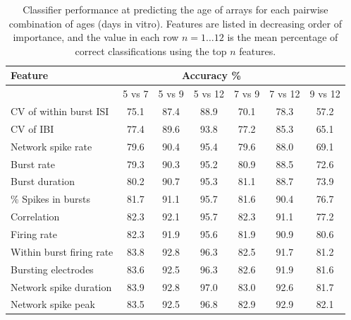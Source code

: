 \documentclass{article}
\begin{document}
\begin{table}
  \centering
  \begin{tabular}{|l|c|c|c|c|c|c|}
	  \hline
	  \textbf{Feature} & \multicolumn{5}{c}{\textbf{Accuracy \%}} & 
	  \\ \hline
	  & 5 vs 7 & 5 vs 9 & 5 vs 12 & 7 vs 9 & 7 vs 12 & 9 vs 12
	  \\ \hline 
		CV of within burst ISI & 75.1 & 87.4 & 88.9 & 70.1 & 78.3 & 57.2
		\\ CV of IBI & 77.4 & 89.6 & 93.8 & 77.2 & 85.3 & 65.1
		\\ Network spike rate& 79.6 & 90.4 & 95.4  & 79.6 & 88.0 & 69.1
		\\ Burst rate & 79.3 & 90.3 & 95.2 & 80.9 & 88.5 & 72.6
		\\ Burst duration& 80.2 & 90.7 & 95.3 & 81.1 & 88.7 & 73.9
		\\ \% Spikes in bursts & 81.7 & 91.1 & 95.7 & 81.6 & 90.4 & 76.7
		\\ Correlation & 82.3 & 92.1 & 95.7 & 82.3 & 91.1 & 77.2
		\\ Firing rate & 82.3 & 91.9 & 95.6 & 81.9 & 90.9 & 80.6
		\\ Within burst firing rate & 83.8 & 92.8 & 96.3 & 82.5 & 91.7 & 81.2
		\\ Bursting electrodes & 83.6 & 92.5 & 96.3 & 82.6 & 91.9 & 81.6
		\\ Network spike duration & 83.9 & 92.8 & 97.0 & 83.0 & 92.6 & 81.7
		\\ Network spike peak & 83.5 & 92.5 & 96.8 & 82.9 & 92.9 & 82.1
	\\ \hline
\end{tabular}
  \caption{Classifier performance at predicting the age of arrays for
    each pairwise combination of ages (days in vitro). Features are listed in
    decreasing order of importance, and the value in each row
    $n=1 \ldots 12$ is the mean percentage of correct classifications using
    the top $n$ features.}
\end{table}
\end{document}
